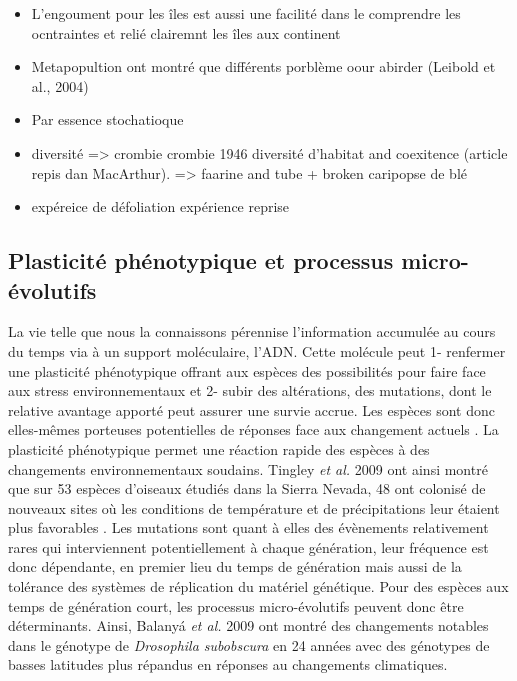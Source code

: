 \begin{itemize}
\item
  L'engoument pour les îles est aussi une facilité dans le comprendre
  les ocntraintes et relié clairemnt les îles aux continent
\item
  Metapopultion ont montré que différents porblème oour abirder (Leibold
  et al., 2004)
\item
  Par essence stochatioque
\item
  diversité =\textgreater{} crombie crombie 1946 diversité d'habitat and
  coexitence (article repis dan MacArthur). =\textgreater{} faarine and
  tube + broken caripopse de blé
\item
  expéreice de défoliation expérience reprise
\end{itemize}

\subsection*{Plasticité phénotypique et processus
micro-évolutifs}\label{plasticituxe9-phuxe9notypique-et-processus-micro-uxe9volutifs}

La vie telle que nous la connaissons pérennise l'information accumulée
au cours du temps via à un support moléculaire, l'ADN. Cette molécule
peut 1- renfermer une plasticité phénotypique offrant aux espèces des
possibilités pour faire face aux stress environnementaux et 2- subir des
altérations, des mutations, dont le relative avantage apporté peut
assurer une survie accrue. Les espèces sont donc elles-mêmes porteuses
potentielles de réponses face aux changement actuels
\cite{Parmesan2006,Lavergne2010}. La plasticité phénotypique permet une
réaction rapide des espèces à des changements environnementaux soudains.
Tingley \textit{et al.} 2009 ont ainsi montré que sur 53 espèces
d'oiseaux étudiés dans la Sierra Nevada, 48 ont colonisé de nouveaux
sites où les conditions de température et de précipitations leur étaient
plus favorables \cite{Tingley2009}. Les mutations sont quant à elles des
évènements relativement rares qui interviennent potentiellement à chaque
génération, leur fréquence est donc dépendante, en premier lieu du temps
de génération mais aussi de la tolérance des systèmes de réplication du
matériel génétique. Pour des espèces aux temps de génération court, les
processus micro-évolutifs peuvent donc être déterminants. Ainsi, Balanyá
\textit{et al.} 2009 ont montré des changements notables dans le
génotype de \textit{Drosophila subobscura} en 24 années avec des
génotypes de basses latitudes plus répandus en réponses au changements
climatiques.

